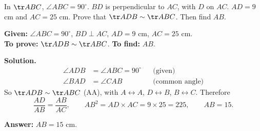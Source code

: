 \begin{example}
In $\tr ABC$, $\angle ABC=90^\circ$. $BD$ is perpendicular to $AC$, with $D$ on $AC$. $AD=9$ cm and $AC=25$ cm. Prove that $\tr ADB\sim\tr ABC$. Then find $AB$.


\textbf{Given:} $\angle ABC=90^\circ$, $BD\perp AC$, $AD=9$ cm, $AC=25$ cm.\\
\textbf{To prove:} $\tr ADB\sim\tr ABC$. \textbf{To find:} $AB$.

\textbf{Solution.}
\[
\begin{aligned}
\angle ADB&=\angle ABC=90^\circ &&\text{(given)}\\
\angle BAD&=\angle CAB &&\text{(common angle)}
\end{aligned}
\]
So $\tr ADB\sim\tr ABC$ (AA), with $A\leftrightarrow A$, $D\leftrightarrow B$, $B\leftrightarrow C$. Therefore
\[
\dfrac{AD}{AB}=\dfrac{AB}{AC},\qquad AB^2=AD\times AC=9\times25=225,\qquad AB=15.
\]

\textbf{Answer:} $AB=15$ cm.
\end{example}

